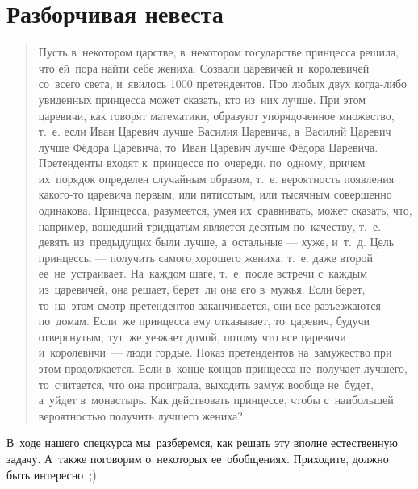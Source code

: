 
\section*{Разборчивая невеста}



\begin{quote}
Пусть в~некотором царстве, в~некотором государстве принцесса решила, что
ей~пора найти себе жениха.
Созвали царевичей и~королевичей со~всего света, и~явилось 1000 претендентов.
Про любых двух когда-либо увиденных принцесса может сказать, кто из~них лучше.
При этом царевичи, как говорят математики, образуют упорядоченное множество,
т.~е. если Иван Царевич лучше Василия Царевича, а~Василий Царевич лучше
Фёдора Царевича, то~Иван Царевич лучше Фёдора Царевича.
Претенденты входят к~принцессе по~очереди, по~одному, причем их~порядок
определен случайным образом, т.~е. вероятность появления какого-то царевича
первым, или пятисотым, или тысячным совершенно одинакова.
Принцесса, разумеется, умея их~сравнивать, может сказать, что, например,
вошедший тридцатым является десятым по~качеству, т.~е. девять из~предыдущих
были лучше, а~остальные — хуже, и~т.~д.
Цель принцессы — получить самого хорошего жениха, т.~е. даже второй
ее~не~устраивает.
На~каждом шаге, т.~е. после встречи с~каждым из~царевичей, она решает, берет~ли
она его в~мужья.
Если берет, то~на~этом смотр претендентов заканчивается, они все разъезжаются
по~домам.
Если~же принцесса ему отказывает, то~царевич, будучи отвергнутым, тут~же
уезжает домой, потому что все царевичи и~королевичи~--- люди гордые.
Показ претендентов на~замужество при этом продолжается.
Если в~конце концов принцесса не~получает лучшего, то~считается, что она
проиграла, выходить замуж вообще не~будет, а~уйдет в~монастырь.
Как действовать принцессе, чтобы с~наибольшей вероятностью
получить лучшего жениха?
\end{quote}

В~ходе нашего спецкурса мы~разберемся, как решать эту вполне естественную
задачу.
А~также поговорим о~некоторых ее~обобщениях.
Приходите, должно быть интересно~;)

